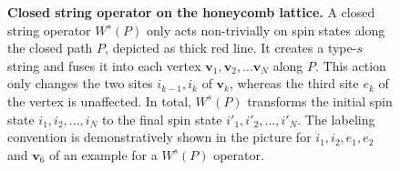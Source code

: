 \begin{figure}[t]
	\caption{\small \textbf{Closed string operator on the honeycomb lattice.} A closed string operator $W^s(P)$ only acts non-trivially on spin states along the closed path $P$, depicted as thick red line. It creates a type-$s$ string and fuses it into each vertex $\mathbf{v}_1,\mathbf{v}_2,...\mathbf{v}_N$ along $P$. This action only changes the two sites $i_{k-1},i_k$ of $\mathbf{v}_k$, whereas the third site $e_k$ of the vertex is unaffected. In total, $W^s(P)$ transforms the initial spin state $i_1,i_2,...,i_N$ to the final spin state $i'_1,i'_2,...,i'_N$. The labeling convention is demonstratively shown in the picture for $i_1,i_2,e_1,e_2$ and $\mathbf{v}_6$ of an example for a $W^s(P)$ operator.\label{fig:excitations}}
\end{figure} 

